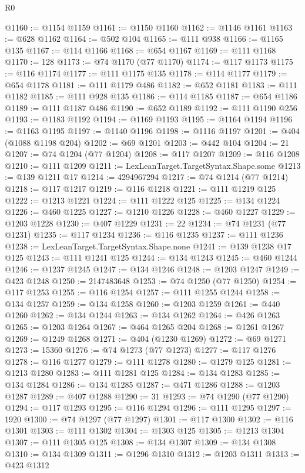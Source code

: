 \begin{lexlean}{R0}
\begin{coremodule}
@1160 := @1154 @1159
@1161 := @1150 @1160
@1162 := @1146 @1161
@1163 := @628 @1162
@1164 := @502 @104
@1165 := @111 @938
@1166 := @1165 @135
@1167 := @114 @1166
@1168 := @654 @1167
@1169 := @111 @1168
@1170 := 128
@1173 := @74 @1170 (@77 @1170)
@1174 := @117 @1173
@1175 := @116 @1174
@1177 := @111 @1175 @135
@1178 := @114 @1177
@1179 := @654 @1178
@1181 := @111 @1179 @486
@1182 := @652 @1181
@1183 := @111 @1182
@1185 := @111 @928 @135
@1186 := @114 @1185
@1187 := @654 @1186
@1189 := @111 @1187 @486
@1190 := @652 @1189
@1192 := @111 @1190 @256
@1193 := @1183 @1192
@1194 := @1169 @1193
@1195 := @1164 @1194
@1196 := @1163 @1195
@1197 := @1140 @1196
@1198 := @1116 @1197
@1201 := @404 (@1088 @1198 @204)
@1202 := @69 @1201
@1203 := @442 @104
@1204 := 21
@1207 := @74 @1204 (@77 @1204)
@1208 := @117 @1207
@1209 := @116 @1208
@1210 := @111 @1209
@1211 := LexLeanTarget.TargetSyntax.Shape.some
@1213 := @139 @1211 @17
@1214 := 4294967294
@1217 := @74 @1214 (@77 @1214)
@1218 := @117 @1217
@1219 := @116 @1218
@1221 := @111 @1219 @125
@1222 := @1213 @1221
@1224 := @111 @1222 @125
@1225 := @134 @1224
@1226 := @460 @1225
@1227 := @1210 @1226
@1228 := @460 @1227
@1229 := @1203 @1228
@1230 := @407 @1229
@1231 := 22
@1234 := @74 @1231 (@77 @1231)
@1235 := @117 @1234
@1236 := @116 @1235
@1237 := @111 @1236
@1238 := LexLeanTarget.TargetSyntax.Shape.none
@1241 := @139 @1238 @17 @125
@1243 := @111 @1241 @125
@1244 := @134 @1243
@1245 := @460 @1244
@1246 := @1237 @1245
@1247 := @134 @1246
@1248 := @1203 @1247
@1249 := @423 @1248
@1250 := 2147483648
@1253 := @74 @1250 (@77 @1250)
@1254 := @117 @1253
@1255 := @116 @1254
@1257 := @111 @1255 @1244
@1258 := @134 @1257
@1259 := @134 @1258
@1260 := @1203 @1259
@1261 := @440 @1260
@1262 := @134 @1244
@1263 := @134 @1262
@1264 := @426 @1263
@1265 := @1203 @1264
@1267 := @464 @1265 @204
@1268 := @1261 @1267
@1269 := @1249 @1268
@1271 := @404 (@1230 @1269)
@1272 := @69 @1271
@1273 := 15360
@1276 := @74 @1273 (@77 @1273)
@1277 := @117 @1276
@1278 := @116 @1277
@1279 := @111 @1278
@1280 := @1279 @125
@1281 := @1213 @1280
@1283 := @111 @1281 @125
@1284 := @134 @1283
@1285 := @134 @1284
@1286 := @134 @1285
@1287 := @471 @1286
@1288 := @1203 @1287
@1289 := @407 @1288
@1290 := 31
@1293 := @74 @1290 (@77 @1290)
@1294 := @117 @1293
@1295 := @116 @1294
@1296 := @111 @1295
@1297 := 1920
@1300 := @74 @1297 (@77 @1297)
@1301 := @117 @1300
@1302 := @116 @1301
@1303 := @111 @1302
@1304 := @1303 @125
@1305 := @1213 @1304
@1307 := @111 @1305 @125
@1308 := @134 @1307
@1309 := @134 @1308
@1310 := @134 @1309
@1311 := @1296 @1310
@1312 := @1203 @1311
@1313 := @423 @1312

\end{coremodule}
\end{lexlean}
